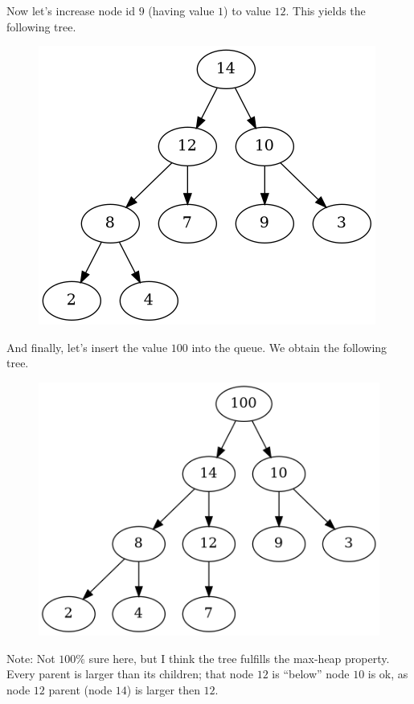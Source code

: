 Now let's increase node id $9$ (having value $1$) to value $12$. This yields the following tree.


\begin{figure}[H]
\centering
\includegraphics[scale=0.5]{images/heap_queue_03.png}
\end{figure}

And finally, let's insert the value $100$ into the queue. We obtain the following tree.

\begin{figure}[H]
\centering
\includegraphics[scale=0.5]{images/heap_queue_04.png}
\end{figure}

Note: Not $100\%$ sure here, but I think the tree fulfills the max-heap property. Every parent is larger than its children; that node $12$ is ``below'' node $10$ is ok, as node $12$ parent (node $14$) is larger then $12$.

